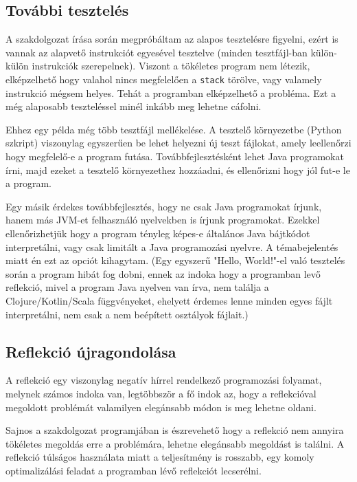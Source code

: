 \subsection{További tesztelés}

A szakdolgozat írása során megpróbáltam az alapos tesztelésre figyelni, ezért is vannak az alapvető instrukciót egyesével tesztelve (minden tesztfájl-ban külön-külön instrukciók szerepelnek). Viszont a tökéletes program nem létezik, elképzelhető hogy valahol nincs megfelelően a \lstinline{stack} törölve, vagy valamely instrukció mégsem helyes. Tehát a programban elképzelhető a probléma. Ezt a még alaposabb teszteléssel minél inkább meg lehetne cáfolni.

Ehhez egy példa még több tesztfájl mellékelése. A tesztelő környezetbe (Python szkript) viszonylag egyszerűen be lehet helyezni új teszt fájlokat, amely leellenőrzi hogy megfelelő-e a program futása. Továbbfejlesztésként lehet Java programokat írni, majd ezeket a tesztelő környezethez hozzáadni, és ellenőrizni hogy jól fut-e le a program.

Egy másik érdekes továbbfejlesztés, hogy ne csak Java programokat írjunk, hanem más JVM-et felhasználó nyelvekben is írjunk programokat. Ezekkel ellenőrizhetjük hogy a program tényleg képes-e általános Java bájtkódot interpretálni, vagy csak limitált a Java programozási nyelvre. A témabejelentés miatt én ezt az opciót kihagytam. (Egy egyszerű "Hello, World!"-el való tesztelés során a program hibát fog dobni, ennek az indoka hogy a programban levő reflekció, mivel a program Java nyelven van írva, nem találja a Clojure/Kotlin/Scala függvényeket, ehelyett érdemes lenne minden egyes fájlt interpretálni, nem csak a nem beépített osztályok fájlait.)

\subsection{Reflekció újragondolása}

A reflekció egy viszonylag negatív hírrel rendelkező programozási folyamat, melynek számos indoka van, legtöbbször a fő indok az, hogy a reflekcióval megoldott problémát valamilyen elegánsabb módon is meg lehetne oldani.

Sajnos a szakdolgozat programjában is észrevehető hogy a reflekció nem annyira tökéletes megoldás erre a problémára, lehetne elegánsabb megoldást is találni. A reflekció túlságos használata miatt a teljesítmény is rosszabb, egy komoly optimalizálási feladat a programban lévő reflekciót lecserélni.

